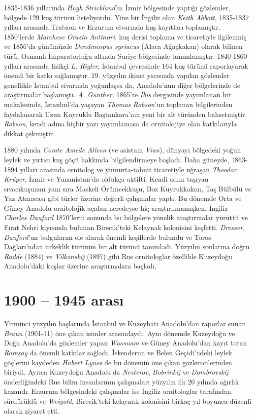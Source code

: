 \documentclass[
  a4paper,
  DIV=11,
  numbers=noendperiod]{scrartcl}
\begin{document}
1835-1836 yıllarında \emph{Hugh Strickland}'ın İzmir bölgesinde yaptığı
gözlemler, bölgede 129 kuş türünü listeliyordu. Yine bir İngiliz olan
\emph{Keith Abbott}, 1835-1837 yılları arasında Trabzon ve Erzurum
civarında kuş kayıtları toplamıştır. 1850'lerde \emph{Marchese Orazio
Antinori}, kuş derisi toplama ve ticaretiyle ilgilenmiş ve 1856'da
günümüzde \emph{Dendrocopus syriacus} (Alaca Ağaçkakan) olarak bilinen
türü, Osmanlı İmparatorluğu altında Suriye bölgesinde tanımlamıştır.
1840-1860 yılları arasında fizikçi \emph{L. Rigler}, İstanbul çevresinde
164 kuş türünü raporlayarak önemli bir katkı sağlamıştır. 19. yüzyılın
ikinci yarısında yapılan gözlemler genellikle İstanbul civarında
yoğunlaşsa da, Anadolu'nun diğer bölgelerinde de araştırmalar
başlamıştı. \emph{A. Günther}, 1865'te \emph{Ibis} dergisinde yayımlanan
bir makalesinde, İstanbul'da yaşayan \emph{Thomas Robson}'un toplanan
bilgilerinden faydalanarak Uzun Kuyruklu Baştankara'nın yeni bir alt
türünden bahsetmiştir. \emph{Robson}, kendi adına hiçbir yazı
yayımlamasa da ornitolojiye olan katkılarıyla dikkat çekmiştir.

1880 yılında \emph{Comte Amede Alleon} (ve asistanı \emph{Vian}),
dünyayı bölgedeki yoğun leylek ve yırtıcı kuş göçü hakkında
bilgilendirmeye başladı. Daha güneyde, 1863-1894 yılları arasında
ornitolog ve yumurta-tahnit ticaretiyle uğraşan \emph{Theodor Krüper},
İzmir ve Yunanistan'da oldukça aktifti. Kendi adını taşıyan
sıvacıkuşunun yanı sıra Maskeli Örümcekkuşu, Boz Kuyrukkakan, Taş
Bülbülü ve Yaz Atmacası gibi türler üzerine değerli çalışmalar yaptı. Bu
dönemde Orta ve Güney Anadolu ornitolojik açıdan neredeyse hiç
araştırılmamışken, İngiliz \emph{Charles Danford} 1870'lerin sonunda bu
bölgelere yönelik araştırmalar yürüttü ve Fırat Nehri kıyısında bulunan
Birecik'teki Kelaynak kolonisini keşfetti. \emph{Dresser},
\emph{Danford}'un bulgularını ele alarak önemli keşiflerde bulundu ve
Toros Dağları'ndan urkeklik türünün bir alt türünü tanımladı. Yüzyılın
sonlarına doğru \emph{Radde} (1884) ve \emph{Vilkonskij} (1897) gibi Rus
ornitologlar özellikle Kuzeydoğu Anadolu'daki kuşlar üzerine
araştırmalara başladı.

\section*{1900 -- 1945 arası}\label{arasux131}


Yirminci yüzyılın başlarında İstanbul ve Kuzeybatı Anadolu'dan raporlar
sunan \emph{Braun} (1901-11) öne çıkan isimler arasındaydı. Aynı dönemde
Kuzeydoğu ve Doğu Anadolu'da gözlemler yapan \emph{Woosnam} ve Güney
Anadolu'dan kayıt tutan \emph{Ramsay} da önemli katkılar sağladı.
İskenderun ve Belen Geçidi'ndeki leylek göçlerini kaydeden \emph{Hubert
Lynes} de bu dönemin öne çıkan gözlemcilerinden biriydi. Ayrıca
Kuzeydoğu Anadolu'da \emph{Nesterov}, \emph{Bobrinkij} ve
\emph{Dombrovskij} önderliğindeki Rus bilim insanlarının çalışmaları
yüzyılın ilk 20 yılında ağırlık kazandı. Erzurum bölgesindeki çalışmalar
ise İngiliz ornitologlar tarafından sürdürüldü ve \emph{Weigold},
Birecik'teki kelaynak kolonisini birkaç yıl boyunca düzenli olarak
ziyaret etti.
\end{document}
